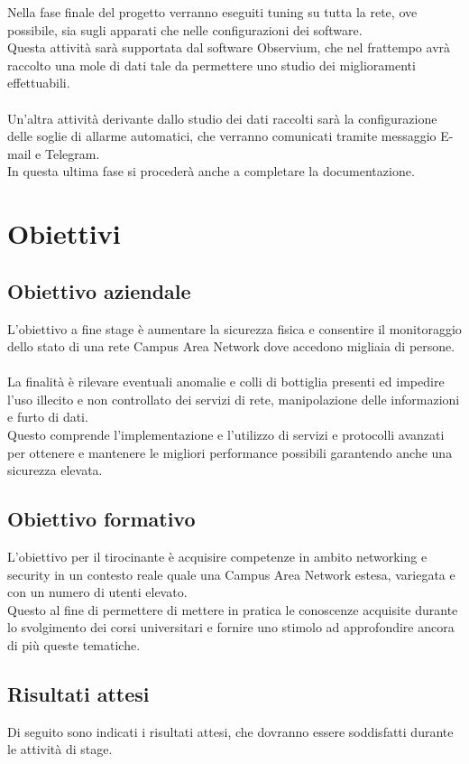 \documentclass[Tesi.tex]{subfiles}
\begin{document}
Nella fase finale del progetto verranno eseguiti tuning su tutta la rete, ove possibile, sia sugli apparati che nelle configurazioni dei software. \\
Questa attività sarà supportata dal software Observium, che nel frattempo avrà raccolto una mole di dati tale da permettere uno studio dei miglioramenti effettuabili.\\\\
Un'altra attività derivante dallo studio dei dati raccolti sarà la configurazione delle soglie di allarme automatici, che verranno comunicati tramite messaggio E-mail e Telegram. \\
In questa ultima fase si procederà anche a completare la documentazione. 

\section{Obiettivi}
\subsection{Obiettivo aziendale}
L'obiettivo a fine stage è aumentare la sicurezza fisica e consentire il monitoraggio dello stato di una rete Campus Area Network dove accedono migliaia di persone. \\\\
La finalità è rilevare eventuali anomalie e colli di bottiglia presenti ed impedire l'uso illecito e non controllato dei servizi di rete, manipolazione delle informazioni e furto di dati. \\
Questo comprende l'implementazione e l'utilizzo di servizi e protocolli avanzati per ottenere e mantenere le migliori performance possibili garantendo anche una sicurezza elevata.

\subsection{Obiettivo formativo}
L'obiettivo per il tirocinante è acquisire competenze in ambito networking e security in un contesto reale quale una Campus Area Network estesa, variegata e con un numero di utenti elevato. \\
Questo al fine di permettere di mettere in pratica le conoscenze acquisite durante lo svolgimento dei corsi universitari e fornire uno stimolo ad approfondire ancora di più queste tematiche.


\subsection{Risultati attesi}
Di seguito sono indicati i risultati attesi, che dovranno essere soddisfatti durante le attività di stage.
\end{document}
